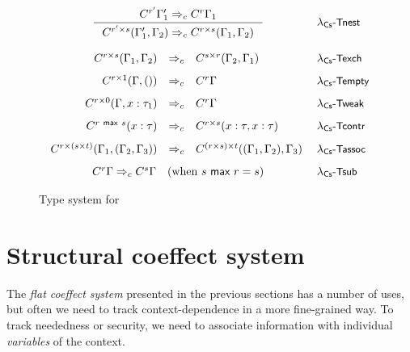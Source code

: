 \begin{figure*}[t]
\begin{equation*}
\begin{array}{rcll}
\multicolumn{3}{c}{
  \inference
    {  \ctxtrans{\ctyp{r'}{\Gamma_1'}}{\ctyp{r}{\Gamma_1}} }
    {  \ctxtrans{\ctyp{r'\cprd s}{(\Gamma_1', \Gamma_2)}}{\ctyp{r\cprd s}{(\Gamma_1, \Gamma_2)}} }
}&
\textnormal{\rulest{nest}}
\\[2.0em]
  \ctxtrans{\ctyp{r\cprd s}{(\Gamma_1, \Gamma_2)} &}{& \ctyp{s\cprd r}{(\Gamma_2, \Gamma_1)}}&
\textnormal{\rulest{exch}}
\\[0.8em]
  \ctxtrans{ \ctyp{r \cprd 1}{(\Gamma, ())} &}{&
    \ctyp{r}{\Gamma}}&
\textnormal{\rulest{empty}}
\\[0.8em]
  \ctxtrans{\ctyp{r\cprd 0}{(\Gamma, x:\tau_1)} &}{& \ctyp{r}{\Gamma}}&
\textnormal{\rulest{weak}}
\\[0.8em]
  \ctxtrans{\ctyp{r \cvop s}{(x:\tau)} &}{&
    \ctyp{r \cprd s}{(x:\tau, x:\tau)}}&
\textnormal{\rulest{contr}}
\\[0.8em]
  \ctxtrans{\ctyp{r\cprd (s\cprd t)}{(\Gamma_1, (\Gamma_2, \Gamma_3))} &}{&
    \ctyp{(r\cprd s)\cprd t}{((\Gamma_1, \Gamma_2), \Gamma_3)}}\;&
\textnormal{\rulest{assoc}}
\\[0.8em]
\multicolumn{3}{c}{
  \ctxtrans{\ctyp{r}{\Gamma}}{\ctyp{s}{\Gamma}}\quad(\textnormal{when}~s \cvop r = s)
}&
\textnormal{\rulest{sub}}
\end{array}
\end{equation*}

%


\caption{Type system for \clstr}
\label{fig:structural-coeffect-typing}
\end{figure*}

\newpage


\section{Structural coeffect system}
\label{sec:structural}

The \emph{flat coeffect system} presented in the previous sections has a number of uses, but often
we need to track context-dependence in a more fine-grained way. To track neededness or security, 
we need to associate information with individual \emph{variables} of the context. 

